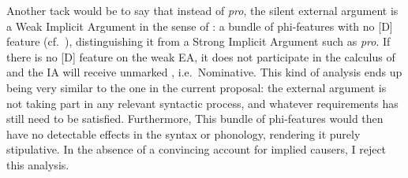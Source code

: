 \begin{exe}
\begin{xlist}
\begin{xlist}
\begin{exe}
\begin{exe}
\begin{xlist}
\begin{exe}
\begin{xlist}
\begin{exe}
\begin{xlist}
\begin{xlist}
\begin{exe}
\begin{xlist}
\begin{exe}
\begin{xlist}
\begin{exe}
\begin{exe}
\begin{exe}
\begin{xlist}
\begin{exe}
\begin{exe}
\begin{xlist}
\begin{xlist}
\begin{exe}
\begin{xlist}
\begin{exe}
\begin{exe}
\begin{exe}
\begin{xlist}
\begin{exe}
\begin{exe}
\begin{xlist}
\begin{exe}
\begin{xlist}
\begin{exe}
\begin{xlist}
\begin{exe}
\begin{xlist}
\begin{exe}
\begin{exe}
\begin{xlist}
\begin{exe}
\begin{exe}
\begin{xlist}
\begin{xlist}
\begin{exe}
\begin{xlist}
\begin{xlist}
\begin{exe}
\begin{xlist}
\begin{exe}
\begin{xlist}
\begin{exe}
\begin{xlist}
\begin{exe}
\begin{xlist}
\begin{exe}
\begin{exe}
\begin{exe}
\begin{exe}
\begin{xlist}
\begin{exe}
\begin{exe}
\begin{xlist}
\begin{xlist}
\begin{exe}
\begin{exe}
\begin{xlist}
\begin{exe}
\begin{xlist}
\begin{exe}
\begin{xlist}
	
 \z
\z 

Another tack would be to say that instead of \emph{pro}, the silent external argument is a Weak Implicit Argument in the sense of \cite{landau10}: a bundle of phi-features with no [D] feature (cf.~\citealt{legate14,bhattpancheva17}), distinguishing it from a Strong Implicit Argument such as \emph{pro}. If there is no [D] feature on the weak EA, it does not participate in the calculus of  and the IA will receive unmarked , i.e.~Nominative. This kind of analysis ends up being very similar to the one in the current proposal: the external argument is not taking part in any relevant syntactic process, and whatever requirements {\vd} has still need to be satisfied. Furthermore, This bundle of phi-features would then have no detectable effects in the syntax or phonology, rendering it purely stipulative. In the absence of a convincing account for implied causers, I reject this analysis.


\end{xlist}
\end{exe}
\end{xlist}
\end{exe}
\end{xlist}
\end{exe}
\end{exe}
\end{xlist}
\end{xlist}
\end{exe}
\end{exe}
\end{xlist}
\end{exe}
\end{exe}
\end{exe}
\end{exe}
\end{xlist}
\end{exe}
\end{xlist}
\end{exe}
\end{xlist}
\end{exe}
\end{xlist}
\end{exe}
\end{xlist}
\end{xlist}
\end{exe}
\end{xlist}
\end{xlist}
\end{exe}
\end{exe}
\end{xlist}
\end{exe}
\end{exe}
\end{xlist}
\end{exe}
\end{xlist}
\end{exe}
\end{xlist}
\end{exe}
\end{xlist}
\end{exe}
\end{exe}
\end{xlist}
\end{exe}
\end{exe}
\end{exe}
\end{xlist}
\end{exe}
\end{xlist}
\end{xlist}
\end{exe}
\end{exe}
\end{xlist}
\end{exe}
\end{exe}
\end{exe}
\end{xlist}
\end{exe}
\end{xlist}
\end{exe}
\end{xlist}
\end{xlist}
\end{exe}
\end{xlist}
\end{exe}
\end{xlist}
\end{exe}
\end{exe}
\end{xlist}
\end{xlist}
\end{exe}
